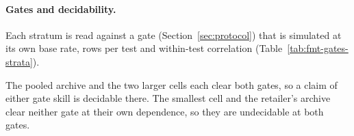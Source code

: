 \paragraph{Gates and decidability.}
\label{sec:gates-results}
Each stratum is read against a gate (Section~\ref{sec:protocol}) that is simulated at its own base rate, rows per test and within-test correlation (Table~\ref{tab:fmt-gates-strata}).

\begin{table}[t]\centering\scriptsize
\caption{One gate rule applies to every stratum. Top: scored tests, the dependence specific to each stratum, the gates at Brier skill 0.20 and 0.10 at a decision target of 0.90, and the skills at which its claims are decidable. Bottom: the Brier skill of three models in each stratum, with the interval adjusted for the family of models that the run's output holds for that stratum (five on the headline archive, four on the retailer's), of which the table shows three, or two on the retailer's archive, where no text classifier runs.}
\label{tab:fmt-gates-strata}

\end{table}

The pooled archive and the two larger cells each clear both gates, so a claim of either gate skill is decidable there. The smallest cell and the retailer's archive clear neither gate at their own dependence, so they are undecidable at both gates.

